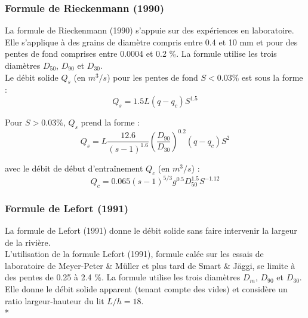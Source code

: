 \documentclass[a4paper,10pt]{article}
\begin{document}

\subsubsection{Formule de Rieckenmann (1990)}

\noindent
La formule de Rieckenmann (1990) s'appuie sur des exp\'eriences en laboratoire. Elle s'applique \`a des grains de diam\`etre compris entre 0.4 et 10 mm et pour des pentes de fond comprises entre 0.0004 et 0.2 \%. La formule utilise les trois diam\`etres  $D_{50}$, $D_{90}$ et $D_{30}$. \\

\noindent
Le d\'ebit solide $Q_s$ (en $m^3/s$) pour les pentes de fond $S < 0.03 \%$ est sous la forme :
$$ Q_s = 1.5 L (q - q_c) S^{1.5} $$

\noindent
Pour $S > 0.03 \%$, $Q_s$ prend la forme :
$$ Q_s = L \frac{12.6}{(s-1)^{1.6}} \left(\frac{D_{90}}{D_{30}}\right)^{0.2} (q - q_c) S^2$$ 

\noindent
avec le d\'ebit de d\'ebut d'entra\^inement $Q_c$ (en $m^3/s$) :
$$ Q_c = 0.065 (s-1)^{5/3} g^{0.5} D_{50}^{1.5} S^{-1.12} $$


\subsubsection{Formule de Lefort (1991)}

\noindent
La formule de Lefort (1991) donne le d\'ebit solide sans faire intervenir la largeur de la rivi\`ere.\\

\noindent
L'utilisation de la formule Lefort (1991), formule cal\'ee sur les essais de laboratoire de Meyer-Peter \& M\"uller et plus tard de Smart \& J\"aggi, se limite \`a des pentes de 0.25 \`a 2.4 \%. La formule utilise les trois diam\`etres $D_m$, $D_{90}$ et $D_{30}$. Elle donne le d\'ebit solide apparent (tenant compte des vides) et consid\`ere un ratio largeur-hauteur du lit $L/h = 18$. \\*
\end{document}
